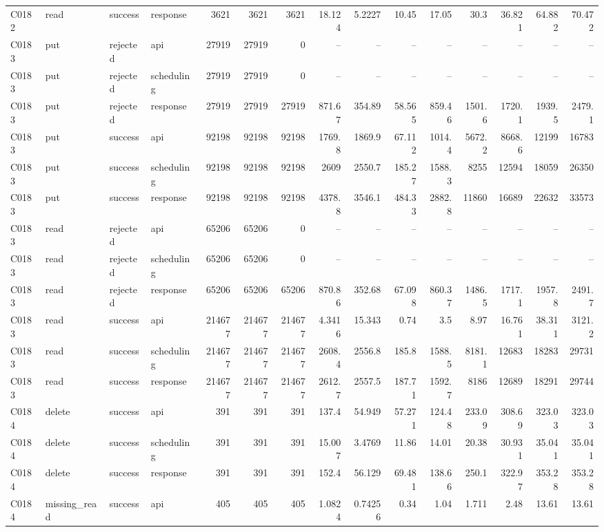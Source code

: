 \begin{landscape}
\begin{longtable}{llllrrrrrrrrrrr}
C0182 & read & success & response & 3621 & 3621 & 3621 & 18.124 & 5.2227 & 10.45 & 17.05 & 30.3 & 36.821 & 64.882 & 70.472\\
C0183 & put & rejected & api & 27919 & 27919 & 0 & -- & -- & -- & -- & -- & -- & -- & --\\
C0183 & put & rejected & scheduling & 27919 & 27919 & 0 & -- & -- & -- & -- & -- & -- & -- & --\\
C0183 & put & rejected & response & 27919 & 27919 & 27919 & 871.67 & 354.89 & 58.565 & 859.46 & 1501.6 & 1720.1 & 1939.5 & 2479.1\\
C0183 & put & success & api & 92198 & 92198 & 92198 & 1769.8 & 1869.9 & 67.112 & 1014.4 & 5672.2 & 8668.6 & 12199 & 16783\\
C0183 & put & success & scheduling & 92198 & 92198 & 92198 & 2609 & 2550.7 & 185.27 & 1588.3 & 8255 & 12594 & 18059 & 26350\\
C0183 & put & success & response & 92198 & 92198 & 92198 & 4378.8 & 3546.1 & 484.33 & 2882.8 & 11860 & 16689 & 22632 & 33573\\
C0183 & read & rejected & api & 65206 & 65206 & 0 & -- & -- & -- & -- & -- & -- & -- & --\\
C0183 & read & rejected & scheduling & 65206 & 65206 & 0 & -- & -- & -- & -- & -- & -- & -- & --\\
C0183 & read & rejected & response & 65206 & 65206 & 65206 & 870.86 & 352.68 & 67.098 & 860.37 & 1486.5 & 1717.1 & 1957.8 & 2491.7\\
C0183 & read & success & api & 214677 & 214677 & 214677 & 4.3416 & 15.343 & 0.74 & 3.5 & 8.97 & 16.761 & 38.311 & 3121.2\\
C0183 & read & success & scheduling & 214677 & 214677 & 214677 & 2608.4 & 2556.8 & 185.8 & 1588.5 & 8181.1 & 12683 & 18283 & 29731\\
C0183 & read & success & response & 214677 & 214677 & 214677 & 2612.7 & 2557.5 & 187.71 & 1592.7 & 8186 & 12689 & 18291 & 29744\\
C0184 & delete & success & api & 391 & 391 & 391 & 137.4 & 54.949 & 57.271 & 124.48 & 233.09 & 308.69 & 323.03 & 323.03\\
C0184 & delete & success & scheduling & 391 & 391 & 391 & 15.007 & 3.4769 & 11.86 & 14.01 & 20.38 & 30.931 & 35.041 & 35.041\\
C0184 & delete & success & response & 391 & 391 & 391 & 152.4 & 56.129 & 69.481 & 138.66 & 250.1 & 322.97 & 353.28 & 353.28\\
C0184 & missing\_\allowbreak{}read & success & api & 405 & 405 & 405 & 1.0824 & 0.74256 & 0.34 & 1.04 & 1.711 & 2.48 & 13.61 & 13.61\\

\end{longtable}
\end{landscape}

